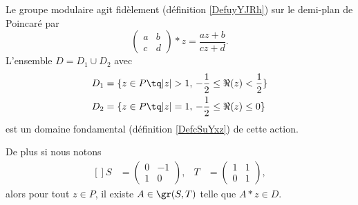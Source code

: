 \begin{theorem} \label{ThoItqXCm}
    Le groupe modulaire agit fidèlement (définition \ref{DefuyYJRh}) sur le demi-plan de Poincaré par
    \begin{equation}    \label{EqVXvwlB}
        \begin{pmatrix}
            a    &   b    \\ 
            c    &   d    
        \end{pmatrix}*z=\frac{ az+b }{ cz+d }.
    \end{equation}
    L'ensemble \(D= D_1\cup D_2\) avec
    \begin{subequations}
        \begin{align}
            D_1&=\{ z\in P\tq | z |>1,\,-\frac{ 1 }{2}\leq \Re(z)<\frac{ 1 }{2} \}\\
            D_2&=\{ z\in P\tq | z |=1,\,-\frac{ 1 }{2}\leq \Re(z)\leq0 \}
        \end{align}
    \end{subequations}
    est un domaine fondamental (définition \ref{DefcSuYxz}) de cette action.

    De plus si nous notons 
    \begin{equation}
        \begin{aligned}[]
            S&=\begin{pmatrix}
                0    &   -1    \\ 
                1    &   0    
            \end{pmatrix},&T&=\begin{pmatrix}
                1    &   1    \\ 
                0    &   1    
            \end{pmatrix},
        \end{aligned}
    \end{equation}
    alors pour tout \( z\in P\), il existe \( A\in \gr(S,T)\) telle que \( A*z\in D\).
\end{theorem}

